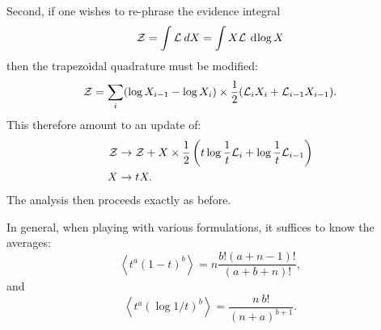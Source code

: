 Second, if one wishes to re-phrase the evidence integral
\begin{equation}
  \mathcal{Z} = \int \mathcal{L} \: dX = \int X\mathcal{L} \: \operatorname{d}^{}\!{\log X}
\end{equation}
then the trapezoidal quadrature must be modified:
\begin{equation}
  \mathcal{Z} = \sum\limits_{i} (\log X_{i-1}-\log X_{i}) \times \frac{1}{2}(\mathcal{L}_i X_i+\mathcal{L}_{i-1} X_{i-1}).
\end{equation}
This therefore amount to an update of:
\begin{align}
  \mathcal{Z} &\to \mathcal{Z} + X \times \frac{1}{2}\left(t\log\frac{1}{t}\mathcal{L}_i + \log\frac{1}{t}\mathcal{L}_{i-1} \right)
  \\
  X &\to t X.
\end{align}
The analysis then proceeds exactly as before. 

In general, when playing with various formulations, it suffices to know the averages:
\begin{equation}
\left\langle t^a{(1-t)}^b \right\rangle = n\frac{b!(a+n-1)!}{(a+b+n)!},
\end{equation}
and
\begin{equation}
  \left\langle t^a{\left( \log1/t \right)}^b \right\rangle 
  = 
  \frac{n\: b!}{{(n+a)}^{b+1}}.
\end{equation}
